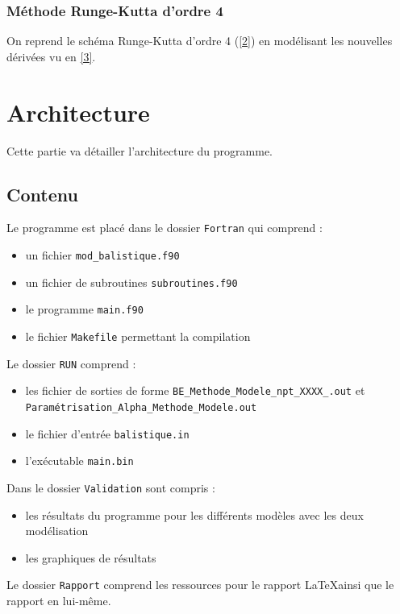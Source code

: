 \documentclass[a4paper,oneside]{article}
\begin{document}
 \subsubsection{Méthode Runge-Kutta d'ordre 4}
 On reprend le schéma Runge-Kutta d'ordre 4 (\ref{2}) en modélisant les nouvelles dérivées vu en \ref{3}.
 
 
\section{Architecture}
Cette partie va détailler l'architecture du programme. 

\subsection{Contenu}

Le programme est placé dans le dossier \verb?Fortran? qui comprend :

\begin{itemize}
	\item un fichier \verb?mod_balistique.f90? %
	\item un fichier de subroutines \verb?subroutines.f90?
	\item le programme \verb?main.f90?
	\item le fichier \verb?Makefile? permettant la compilation\\
	\end{itemize}

Le dossier \verb?RUN? comprend :
\begin{itemize}
	\item les fichier de sorties de forme \verb?BE_Methode_Modele_npt_XXXX_.out? et \verb? Paramétrisation_Alpha_Methode_Modele.out?
	\item le fichier d'entrée \verb?balistique.in?
	\item l'exécutable \verb?main.bin?\\
\end{itemize}

Dans le dossier \verb?Validation? sont compris :
\begin{itemize}
	\item les résultats du programme pour les différents modèles avec les deux modélisation
	\item les graphiques de résultats\\
\end{itemize}

Le dossier \verb?Rapport? comprend les ressources pour le rapport \LaTeX  ainsi que le rapport en lui-même.
\end{document}
